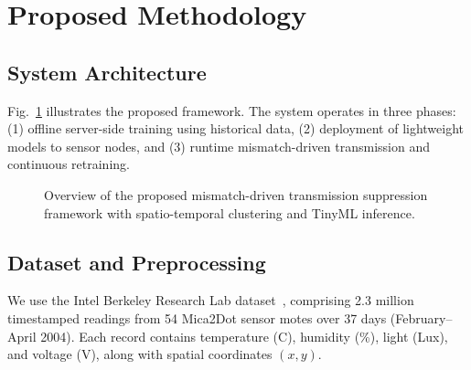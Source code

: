 \documentclass[conference]{IEEEtran}
\begin{document}
\section{Proposed Methodology}
\label{sec:methodology}

\subsection{System Architecture}

Fig.~\ref{fig:architecture} illustrates the proposed framework. The system operates in three phases: (1) offline server-side training using historical data, (2) deployment of lightweight models to sensor nodes, and (3) runtime mismatch-driven transmission and continuous retraining.

\begin{figure}[htbp]
\centerline{}
\caption{Overview of the proposed mismatch-driven transmission suppression framework with spatio-temporal clustering and TinyML inference.}
\label{fig:architecture}
\end{figure}

\subsection{Dataset and Preprocessing}

We use the Intel Berkeley Research Lab dataset~\cite{IntelBerkeley2004}, comprising 2.3 million timestamped readings from 54 Mica2Dot sensor motes over 37 days (February--April 2004). Each record contains temperature (\textdegree C), humidity (\%), light (Lux), and voltage (V), along with spatial coordinates $(x, y)$.
\end{document}
